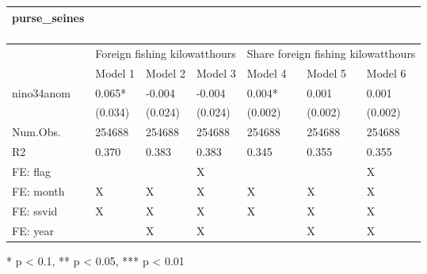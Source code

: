 \captionsetup[table]{labelformat=empty,skip=1pt}
\begin{longtable}{lllllll}
\caption*{
\large purse\_seines\\ 
\small \\ 
} \\ 
\toprule
& \multicolumn{3}{c}{Foreign fishing kilowatthours} & \multicolumn{3}{c}{Share foreign fishing kilowatthours} \\ 
 \cmidrule(lr){2-4}\cmidrule(lr){5-7}
  & Model 1 & Model 2 & Model 3 & Model 4 & Model 5 & Model 6 \\ 
\midrule
nino34anom & 0.065* & -0.004 & -0.004 & 0.004* & 0.001 & 0.001 \\ 
 & (0.034) & (0.024) & (0.024) & (0.002) & (0.002) & (0.002) \\ 
Num.Obs. & 254688 & 254688 & 254688 & 254688 & 254688 & 254688 \\ 
R2 & 0.370 & 0.383 & 0.383 & 0.345 & 0.355 & 0.355 \\ 
FE:  flag &  &  & X &  &  & X \\ 
FE:  month & X & X & X & X & X & X \\ 
FE:  ssvid & X & X & X & X & X & X \\ 
FE:  year &  & X & X &  & X & X \\ 
\bottomrule
\end{longtable}
\begin{minipage}{\linewidth}
* p < 0.1, ** p < 0.05, *** p < 0.01\\ 
\end{minipage}

